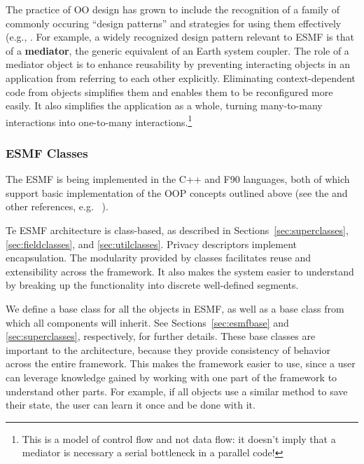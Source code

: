 The practice of OO design has grown to include the recognition of a family
of commonly occuring ``design patterns'' and strategies for using them 
effectively (e.g., \cite{alexandrescu, gamma}.  For example, a widely
recognized design pattern relevant to ESMF is that of a {\bf mediator},
the generic equivalent of an Earth system coupler.  The role of a 
mediator object is to enhance reusability by preventing interacting objects 
in an application from referring to each other explicitly.  Eliminating 
context-dependent code from objects simplifies them and enables them to be 
reconfigured more easily.   It also simplifies the application as a whole, turning 
many-to-many interactions into one-to-many interactions.\footnote{This is a 
model of control flow and not data flow:  it doesn't imply that a 
mediator is necessary a serial bottleneck in a parallel code!}  

\subsubsection{ESMF Classes}

The ESMF is being implemented in the C++ and F90 languages, both of which support 
basic implementation of the OOP concepts outlined above (see the  \cite{bib:ESMFimplrep}
and other references, e.g. ~\cite{decyk97, decyk00}).  

Te ESMF architecture is class-based, as described in Sections~\ref{sec:superclasses}, 
\ref{sec:fieldclasses}, and \ref{sec:utilclasses}.  Privacy descriptors 
implement encapsulation.  The modularity provided by classes facilitates reuse
and extensibility across the framework.  It also makes the system easier to 
understand by breaking up the functionality into discrete well-defined segments.

We define a base class for all the objects in ESMF, as well as a base class 
from which all components will inherit.  See Sections~\ref{sec:esmfbase} and 
\ref{sec:superclasses}, respectively, for further details.  These base
classes are important to the architecture, because they provide consistency
of behavior across the entire framework.  This makes the framework easier
to use, since a user can leverage knowledge gained by working with one
part of the framework to understand other parts.  For example, if all
objects use a similar method to save their state, the user can learn it 
once and be done with it.

